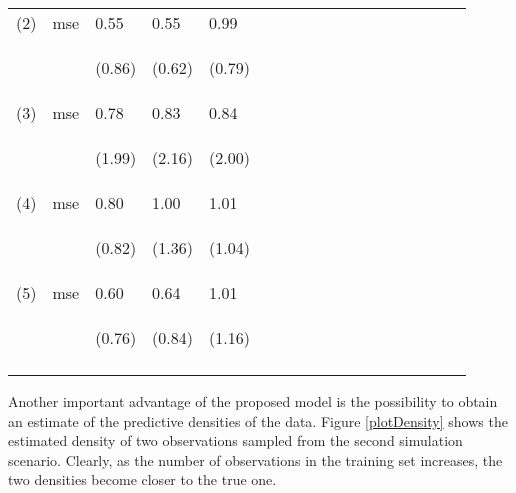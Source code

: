 \documentclass{article}
\begin{document}
\begin{table}[t]
\begin{center}
\begin{small}
\begin{sc}
\begin{tabular}{llllllllllllllllll}
(2)&mse&0.55& 0.55 &0.99\\ 
&& \begin{scriptsize} (0.86)\end{scriptsize} & \begin{scriptsize} (0.62)\end{scriptsize} & \begin{scriptsize} (0.79)\end{scriptsize}\\
(3)&mse&  0.78 &0.83 & 0.84\\
&&   \begin{scriptsize} (1.99)\end{scriptsize} & \begin{scriptsize} (2.16)\end{scriptsize} & \begin{scriptsize} (2.00)\end{scriptsize}\\
(4)&mse& 0.80&1.00&1.01 \\
&& \begin{scriptsize} (0.82)\end{scriptsize}& \begin{scriptsize} (1.36)\end{scriptsize}& \begin{scriptsize} (1.04)\end{scriptsize}\\
(5) &mse & 0.60&0.64 &1.01\\  
&& \begin{scriptsize} (0.76)\end{scriptsize}& \begin{scriptsize} (0.84)\end{scriptsize}& \begin{scriptsize} (1.16)\end{scriptsize}\\
\\
\hline
\end{tabular}
\end{sc}
\end{small}
\end{center}
\vskip -0.1in
\end{table}

Another important advantage of the proposed model is the possibility to obtain an estimate of the predictive densities of the data. Figure \ref{plotDensity} shows the estimated density of two observations sampled from the second simulation scenario. Clearly, as the number of observations in the training set increases, the two densities become closer to the true one.  
	
\end{document}

